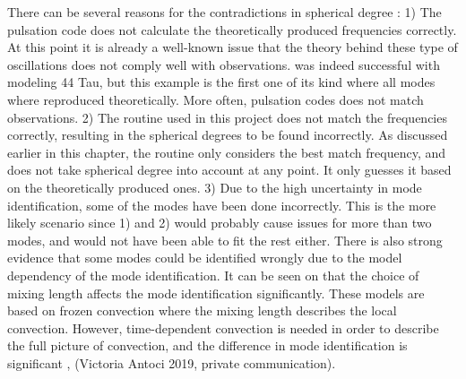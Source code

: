   There can be several reasons for the contradictions in spherical degree : 1) The pulsation code does not calculate the theoretically produced frequencies correctly. At this point it is already a well-known issue that the theory behind these type of oscillations does not comply well with observations. \citet{lenz2010delta} was indeed successful with modeling 44 Tau, but this example is the first one of its kind where all modes where reproduced theoretically. More often, pulsation codes does not match observations. 2)  The \chis routine used in this project does not match the frequencies correctly, resulting in the spherical degrees to be found incorrectly. As discussed earlier in this chapter, the routine only considers the best match frequency, and does not take spherical degree into account at any point. It only guesses it based on the theoretically produced ones. 3) Due to the high uncertainty in mode identification, some of the modes have been done incorrectly. This is the more likely scenario since 1) and 2) would probably cause issues for more than two modes, and would not have been able to fit the rest either. There is also strong evidence that some modes could be identified wrongly due to the model dependency of the mode identification. It can be seen on  that the choice of mixing length affects the mode identification significantly. These models are based on frozen convection where the mixing length describes the local convection. However, time-dependent convection is needed in order to describe the full picture of convection, and the difference in mode identification is significant \citep{dupret2005time}, (Victoria Antoci 2019, private communication).

